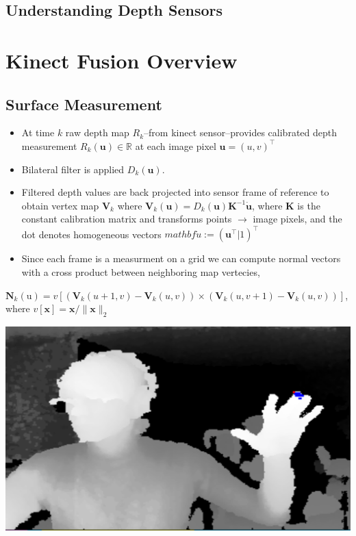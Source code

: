 \documentclass[10pt,twocolumn]{article}
\begin{document}

\subsection{Understanding Depth Sensors}

\section{Kinect Fusion Overview}

\subsection{Surface Measurement}

\begin{itemize}
\item At time $k$ raw depth map $R_k$--from kinect sensor--provides calibrated depth measurement $R_k(\mathbf{u}) \in \mathbb{R}$ at each image pixel $\mathbf{u} = (u,v)^{\top}$
\item Bilateral filter is applied $D_k(\mathbf{u})$. %
\item Filtered depth values are back projected into sensor frame of reference to obtain vertex map $\mathbf{V}_k$ where $\mathbf{V}_k(\mathbf{u}) = D_k(\mathbf{u})\mathbf{K}^{-1}\dot{\mathbf{u}}$, where $\mathbf{K}$ is the constant calibration matrix and transforms points $\rightarrow$ image pixels, and the dot denotes homogeneous vectors $mathbf{\dot{u}} := (\mathbf{u}^{\top}|1)^{\top}$
\item Since each frame is a measurment on a grid we can compute normal vectors with a cross product between neighboring map vertecies,\\ 
\end{itemize}
$\mathbf{N}_k(\mathrm{u}) = v[(\mathbf{V}_k(u+1,v) - \mathbf{V}_k(u, v)) \times (\mathbf{V}_k(u,v+1) - \mathbf{V}_k(u,v))]$, where $v[\mathbf{x}] = \mathbf{x} / \| \mathbf{x} \|_{2}$

\includegraphics[width=0.8\linewidth]{depthimage}
\end{document}
